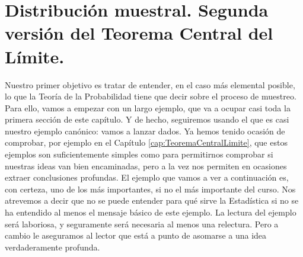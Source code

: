 
\section{Distribución muestral. Segunda versión del Teorema Central del Límite.}
\label{cap06:sec:DistribucionMuestralTCL2}

Nuestro primer objetivo es tratar de entender, en el caso más elemental
posible, lo que la Teoría de la Probabilidad tiene que decir sobre el proceso
de muestreo. Para ello, vamos a empezar con un largo ejemplo, que va a
ocupar casi toda la primera sección de este capítulo. Y de hecho, seguiremos usando el que es casi
nuestro ejemplo canónico: vamos a lanzar dados. Ya hemos tenido ocasión de
comprobar, por ejemplo en el Capítulo \ref{cap:TeoremaCentralLimite}, que estos
ejemplos son suficientemente simples como para permitirnos comprobar si
nuestras ideas van bien encaminadas, pero a la vez nos permiten en ocasiones
extraer conclusiones profundas.  El ejemplo que vamos a ver a continuación es,
con certeza, uno de los más importantes, si no el más importante del curso. Nos
atrevemos a decir que no se puede entender para qué sirve la Estadística si no
se ha entendido al menos el mensaje básico de este ejemplo. La lectura del
ejemplo será laboriosa, y seguramente será necesaria al menos una relectura.
Pero a cambio le aseguramos al lector que está a punto de asomarse a una idea
verdaderamente profunda.
